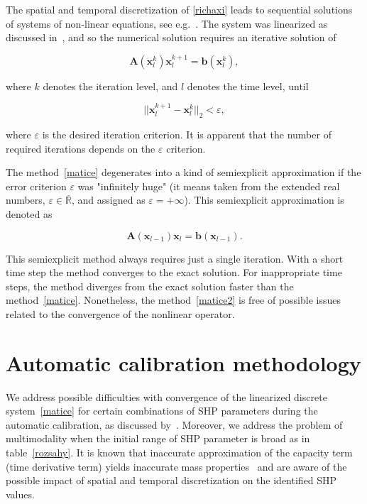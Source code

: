 \documentclass[review,times,3p,10pt]{elsarticle}
\newenvironment{lineq}
    {\begin{linenomath*}
    \begin{equation}
    }
    { 
    \end{equation} 
    \end{linenomath*}
    }
\renewcommand{\vec}{\mathbf}
\begin{document}
 
 The spatial and temporal discretization of \eqref{richaxi} leads to sequential solutions of systems of non-linear equations, see e.g.~\citep{mojecomp}. The system was linearized as discussed in~\citet{mojeacta, mojeamc}, and so the numerical solution requires an iterative solution of 
\begin{lineq}
\label{matice}
\mathbf{A}(\vec{x}_l^k) \vec{x}_l^{k+1} = \vec{b}(\vec{x}_l^k),
\end{lineq}
where $k$ denotes the iteration level, and $l$ denotes the time level, until \begin{lineq} \label{picard} ||\vec{x}_l^{k+1} - \vec{x}_l^k||_2 < \varepsilon , \end{lineq} where $\varepsilon$ is the desired iteration criterion.  It is apparent that the number of required  iterations depends on the $\varepsilon$ criterion. 


The method~\eqref{matice} degenerates into a kind of semiexplicit approximation if the error criterion $\varepsilon$ was "infinitely huge" (it means taken from the extended real numbers, $\varepsilon \in {\overline {\mathbb {R} }}$, and assigned as $\varepsilon = + \infty$). This semiexplicit approximation is denoted as
\begin{lineq}
\label{matice2}
\mathbf{A}(\vec{x}_{l-1}) \vec{x}_l = \vec{b}(\vec{x}_{l-1}).
\end{lineq}
 This semiexplicit method always requires just a single  iteration. With a short time step the method converges to the exact solution. For inappropriate time steps, the method diverges from the exact solution faster than the method~\eqref{matice}. Nonetheless, the method~\eqref{matice2} is free of possible issues related to the convergence of the nonlinear operator.



\section{Automatic calibration methodology}%
\label{methodo}



We address possible difficulties with convergence of the linearized discrete system~\eqref{matice} for certain combinations of SHP parameters during the automatic calibration, as discussed by~\cite{beven2003-uncertain}.
Moreover, we address the problem of multimodality when the initial range of SHP parameter is broad as in table~\ref{rozsahy}.
It is known that inaccurate approximation of the capacity term (time derivative term) yields inaccurate mass properties~\citep{celia} and are aware of the possible impact of spatial and temporal discretization on the identified SHP values.  
\end{document}
